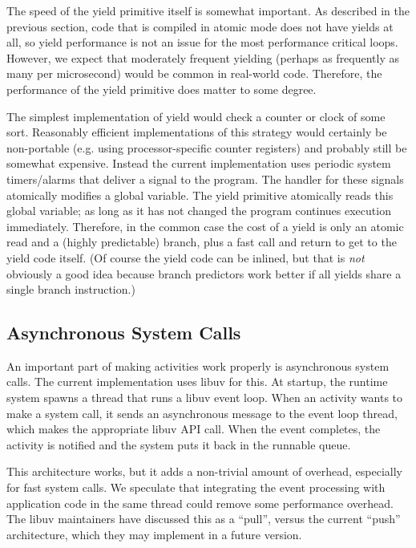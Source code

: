 \documentclass[preprint, 10pt, numbers]{sigplanconf}
\begin{document}
The speed of the yield primitive itself is somewhat important.
As described in the previous section, code that is compiled in atomic mode does not have yields at all, so yield performance is not an issue for the most performance critical loops.
However, we expect that moderately frequent yielding (perhaps as frequently as many per microsecond) would be common in real-world code.
Therefore, the performance of the yield primitive does matter to some degree.

The simplest implementation of yield would check a counter or clock of some sort.
Reasonably efficient implementations of this strategy would certainly be non-portable (e.g. using processor-specific counter registers) and probably still be somewhat expensive.
Instead the current \charcoal{} implementation uses periodic system timers/alarms that deliver a signal to the program.
The handler for these signals atomically modifies a global variable.
The yield primitive atomically reads this global variable; as long as it has not changed the program continues execution immediately.
Therefore, in the common case the cost of a yield is only an atomic read and a (highly predictable) branch, plus a fast call and return to get to the yield code itself.
(Of course the yield code can be inlined, but that is \emph{not} obviously a good idea because branch predictors work better if all yields share a single branch instruction.)

\subsection{Asynchronous System Calls}

An important part of making activities work properly is asynchronous system calls.
The current \charcoal{} implementation uses libuv for this.
At startup, the runtime system spawns a thread that runs a libuv event loop.
When an activity wants to make a system call, it sends an asynchronous message to the event loop thread, which makes the appropriate libuv API call.
When the event completes, the activity is notified and the system puts it back in the runnable queue.

This architecture works, but it adds a non-trivial amount of overhead, especially for fast system calls.
We speculate that integrating the event processing with application code in the same thread could remove some performance overhead.
The libuv maintainers have discussed this as a ``pull'', versus the current ``push'' architecture, which they may implement in a future version.
\end{document}
